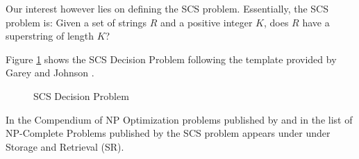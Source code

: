 Our interest however lies on defining the SCS problem.
Essentially, the SCS problem is: Given a set of strings $R$
and a positive integer $K$, does $R$ have a superstring of length $K$?

Figure \ref{fig:scsdp} shows the SCS Decision Problem following the template
provided by Garey and Johnson \cite{GareyJohnson1979}.

\begin{figure}[ht!]
\centering
{}
\caption{SCS Decision Problem }
\label{fig:scsdp}
\end{figure}


In the Compendium of NP Optimization problems published by \cite{AusielloEtAl2000} and in the list of 
NP-Complete Problems published by \cite{GareyJohnson1979} the SCS problem appears under under Storage and Retrieval (SR).